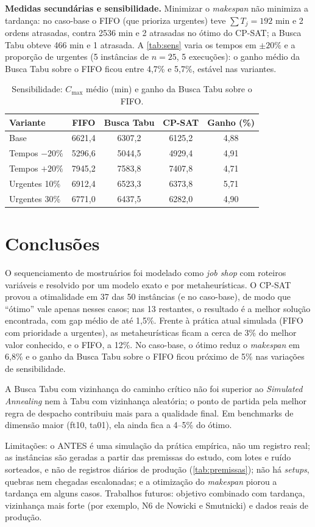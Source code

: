 \textbf{Medidas secundárias e sensibilidade.} Minimizar o \textit{makespan} não minimiza a tardança: no caso-base o FIFO (que prioriza urgentes) teve $\sum T_j = 192$ min e 2 ordens atrasadas, contra 2536 min e 2 atrasadas no ótimo do CP-SAT; a Busca Tabu obteve 466 min e 1 atrasada. A \autoref{tab:sens} varia os tempos em $\pm 20\%$ e a proporção de urgentes (5 instâncias de $n=25$, 5 execuções): o ganho médio da Busca Tabu sobre o FIFO ficou entre 4,7\% e 5,7\%, estável nas variantes.

\begin{table}[htb]
    \centering
    \caption{\label{tab:sens} Sensibilidade: $C_{\max}$ médio (min) e ganho da Busca Tabu sobre o FIFO.}
    \footnotesize
    \begin{tabular}{lcccc}
        \toprule
        Variante & FIFO & Busca Tabu & CP-SAT & Ganho (\%) \\
        \midrule
        Base & 6621,4 & 6307,2 & 6125,2 & 4,88 \\
        Tempos $-20\%$ & 5296,6 & 5044,5 & 4929,4 & 4,91 \\
        Tempos $+20\%$ & 7945,2 & 7583,8 & 7407,8 & 4,71 \\
        Urgentes 10\% & 6912,4 & 6523,3 & 6373,8 & 5,71 \\
        Urgentes 30\% & 6771,0 & 6437,5 & 6282,0 & 4,90 \\
        \bottomrule
    \end{tabular}
\end{table}

\section{Conclusões}

O sequenciamento de mostruários foi modelado como \textit{job shop} com roteiros variáveis e resolvido por um modelo exato e por metaheurísticas. O CP-SAT provou a otimalidade em 37 das 50 instâncias (e no caso-base), de modo que ``ótimo'' vale apenas nesses casos; nas 13 restantes, o resultado é a melhor solução encontrada, com gap médio de até 1,5\%. Frente à prática atual simulada (FIFO com prioridade a urgentes), as metaheurísticas ficam a cerca de 3\% do melhor valor conhecido, e o FIFO, a 12\%. No caso-base, o ótimo reduz o \textit{makespan} em 6,8\% e o ganho da Busca Tabu sobre o FIFO ficou próximo de 5\% nas variações de sensibilidade.

A Busca Tabu com vizinhança do caminho crítico não foi superior ao \textit{Simulated Annealing} nem à Tabu com vizinhança aleatória; o ponto de partida pela melhor regra de despacho contribuiu mais para a qualidade final. Em benchmarks de dimensão maior (ft10, ta01), ela ainda fica a 4--5\% do ótimo.

Limitações: o ANTES é uma simulação da prática empírica, não um registro real; as instâncias são geradas a partir das premissas do estudo, com lotes e ruído sorteados, e não de registros diários de produção (\autoref{tab:premissas}); não há \textit{setups}, quebras nem chegadas escalonadas; e a otimização do \textit{makespan} piorou a tardança em alguns casos. Trabalhos futuros: objetivo combinado com tardança, vizinhança mais forte (por exemplo, N6 de Nowicki e Smutnicki) e dados reais de produção.

